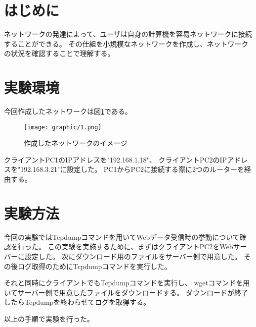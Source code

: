 \documentclass[twocolumn]{jsarticle}
\begin{document}

\section{はじめに}
ネットワークの発達によって、ユーザは自身の計算機を容易ネットワークに接続することができる。
その仕組を小規模なネットワークを作成し、ネットワークの状況を確認することで理解する。

\section{実験環境}
今回作成したネットワークは図\ref*{fig:1}である。

\begin{figure}[H]
  \begin{center}
    \texttt{[image: graphic/1.png]}
  \end{center}
  \caption{作成したネットワークのイメージ}
  \label{fig:1}
\end{figure}

クライアントPC1のIPアドレスを"192.168.1.18"、
クライアントPC2のIPアドレスを"192.168.3.21"に設定した。
PC1からPC2に接続する際に2つのルーターを経由する。

\section{実験方法}
今回の実験ではTcpdumpコマンドを用いてWebデータ受信時の挙動について確認を行った。
この実験を実施するために、まずはクライアントPC2をWebサーバーに設定した。
次にダウンロード用のファイルをサーバー側で用意した。
その後ログ取得のためにTcpdumpコマンドを実行した。

それと同時にクライアントでもTcpdumpコマンドを実行し、
wgetコマンドを用いてサーバー側で用意したファイルをダウンロードする。
ダウンロードが終了したらTcpdumpを終わらせてログを取得する。

以上の手順で実験を行った。
\end{document}
